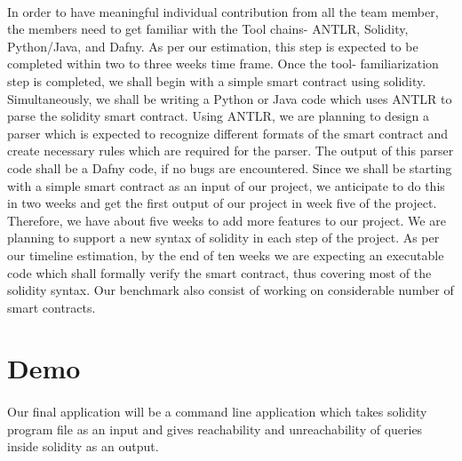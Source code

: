 \documentclass[11pt]{article}
\begin{document}
\paragraph{}
In order to have meaningful individual contribution from all the team member, the members need to get familiar with the Tool chains- ANTLR, Solidity, Python/Java, and Dafny. As per our estimation, this step is expected to be completed within two to three weeks time frame. Once the tool- familiarization step is completed, we shall begin with a simple smart contract using solidity. Simultaneously, we shall be writing a Python or Java code which uses ANTLR to parse the solidity smart contract. Using ANTLR, we are planning to design a parser which is expected to recognize different formats of the smart contract and create necessary rules which are required for the parser. The output of this parser code shall be a Dafny code, if no bugs are encountered. Since we shall be starting with a simple smart contract as an input of our project, we anticipate to do this in two weeks and get the first output of our project in week five of the project. Therefore, we have about five weeks to add more features to our project. We are planning to support a new syntax of solidity in each step of the project. As per our timeline estimation, by the end of ten weeks we are expecting an executable code which shall formally verify the smart contract, thus covering most of the solidity syntax. Our benchmark also consist of working on considerable number of smart contracts.

\section{Demo}

\paragraph{}
Our final application will be a command line application which takes solidity program file as an input and gives reachability and unreachability of queries inside solidity as an output.


 
\end{document}
